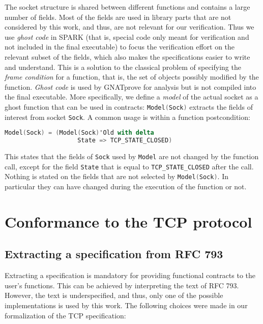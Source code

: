 \documentclass[conference]{IEEEtran}
\def\spark#1{\lstinline[language=Ada]{#1}}
\begin{document}
The socket structure is shared between different functions and contains a large number of fields. Most of the fields are used in library parts that are not considered by this work, and thus, are not relevant for our verification. Thus we use \emph{ghost code} in SPARK (that is, special code only meant for verification and not included in the final executable) to focus the verification effort on the relevant subset of the fields, which also makes the specifications easier to write and understand. This is a solution to the classical problem of specifying the \emph{frame condition} for a function, that is, the set of objects possibly modified by the function. \emph{Ghost code} is used by GNATprove for analysis but is not compiled into the final executable. More specifically, we define a \emph{model} of the actual socket as a ghost function that can be used in contracts: \spark{Model(Sock)} extracts the fields of interest from socket \spark{Sock}. A common usage is within a function postcondition:

\begin{lstlisting}[language=Ada, basicstyle=\small\ttfamily]
Model(Sock) = (Model(Sock)'Old with delta
                    State => TCP_STATE_CLOSED)
\end{lstlisting}

\noindent
This states that the fields of \spark{Sock} used by \spark{Model} are not changed by the function call, except for the field \spark{State} that is equal to \spark{TCP_STATE_CLOSED} after the call. Nothing is stated on the fields that are not selected by \spark{Model(Sock)}. In particular they can have changed during the execution of the function or not.

\section{Conformance to the TCP protocol}
\label{sec:verif}



\subsection{Extracting a specification from RFC 793}

Extracting a specification is mandatory for providing functional contracts to the user's functions. This can be achieved by interpreting the text of RFC 793. However, the text is underspecified, and thus, only one of the possible implementations is used by this work. The following choices were made in our formalization of the TCP specification:
\end{document}
